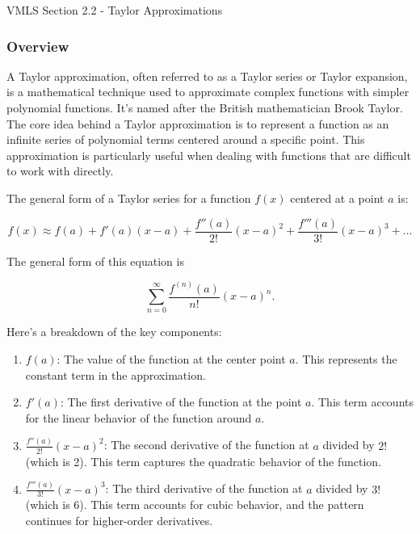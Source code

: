 \begin{notes}{VMLS Section 2.2 - Taylor Approximations}
    \subsubsection*{Overview}

    A Taylor approximation, often referred to as a Taylor series or Taylor expansion, is a mathematical technique used to approximate complex functions with simpler polynomial functions. It's named after the British mathematician 
    Brook Taylor. The core idea behind a Taylor approximation is to represent a function as an infinite series of polynomial terms centered around a specific point. This approximation is particularly useful when dealing with functions 
    that are difficult to work with directly.
    
    The general form of a Taylor series for a function \(f(x)\) centered at a point \(a\) is:
    
    \[f(x) \approx f(a) + f'(a)(x-a) + \frac{f''(a)}{2!}(x-a)^2 + \frac{f'''(a)}{3!}(x-a)^3 + \ldots\]

    The general form of this equation is 

    \begin{equation*}
        \sum^{\infty}_{n=0} \frac{f^{(n)}(a)}{n!}(x-a)^{n}.
    \end{equation*}
    
    Here's a breakdown of the key components:
    
    \begin{enumerate}
        \item \(f(a)\): The value of the function at the center point \(a\). This represents the constant term in the approximation.
        
        \item \(f'(a)\): The first derivative of the function at the point \(a\). This term accounts for the linear behavior of the function around \(a\).
        
        \item \(\frac{f''(a)}{2!}(x-a)^2\): The second derivative of the function at \(a\) divided by \(2!\) (which is 2). This term captures the quadratic behavior of the function.
        
        \item \(\frac{f'''(a)}{3!}(x-a)^3\): The third derivative of the function at \(a\) divided by \(3!\) (which is 6). This term accounts for cubic behavior, and the pattern continues for higher-order derivatives.
    \end{enumerate}
    

\end{notes}
